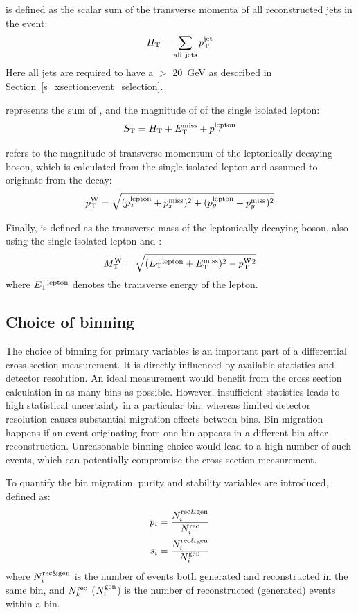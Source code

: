 \HT is defined as the scalar sum of the transverse momenta of all reconstructed jets in the event:
\[H_{\mathrm{T}} = \sum_{\mathrm{all~jets}}p_{\mathrm{T}}^{\mathrm{jet}}\]
Here all jets are required to have a \pt $>$ \SI{20}{\GeV} as described in Section~\ref{s_xsection:event_selection}.

\ST represents the sum of \HT, \MET and the magnitude of \pt of the single isolated lepton:
\[S_{\mathrm{T}} = H_{\mathrm{T}} + E_{\mathrm{T}}^{\textrm{miss}} + p_\mathrm{T}^\mathrm{lepton}\]

\WPT refers to the magnitude of transverse momentum of the leptonically decaying \W boson, which is calculated from the
single isolated lepton and \MET assumed to originate from the \ttbar decay:
\[p_\mathrm{T}^{\mathrm{W}} = \sqrt{(p_x^{\mathrm{lepton}} + p_x^{\mathrm{miss}})^2 + (p_y^{\mathrm{lepton}} + p_y^{\mathrm{miss}})^2}\]

Finally, \MT is defined as the transverse mass of the leptonically decaying \W boson, also using the single isolated
lepton and \MET:
\[M_\mathrm{T}^{\mathrm{W}} = \sqrt{(E_{\mathrm{T}} {}^{\mathrm{lepton}} +E_{\mathrm{T}}^{\textrm{miss}})^2 - p_\mathrm{T}^{\mathrm{W}} {}^2}\]
where $E_{\mathrm{T}} {}^{\mathrm{lepton}}$ denotes the transverse energy of the lepton.

\subsection{Choice of binning}
\label{ss_xsection:binning}

The choice of binning for primary variables is an important part of a differential cross section measurement. It is
directly influenced by available statistics and detector resolution. An ideal measurement would benefit from the cross
section calculation in as many bins as possible. However, insufficient statistics leads to high statistical uncertainty
in a particular bin, whereas limited detector resolution causes substantial migration effects between bins. Bin
migration happens if an event originating from one bin appears in a different bin after reconstruction. Unreasonable
binning choice would lead to a high number of such events, which can potentially compromise the cross section
measurement.

To quantify the bin migration, purity and stability variables are introduced, defined as:
\begin{align}
p_i = \frac{N^{\mathrm{rec}\&\mathrm{gen}}_i}{N^{\mathrm{rec}}_i} \\
s_i = \frac{N^{\mathrm{rec}\&\mathrm{gen}}_i}{N^{\mathrm{gen}}_i}
\end{align}
where $N^{\mathrm{rec}\&\mathrm{gen}}_i$ is the number of events both generated and reconstructed in the same bin, and
$N^{\mathrm{rec}}_k$ ($N^{\mathrm{gen}}_i$) is the number of reconstructed (generated) events within a bin.


